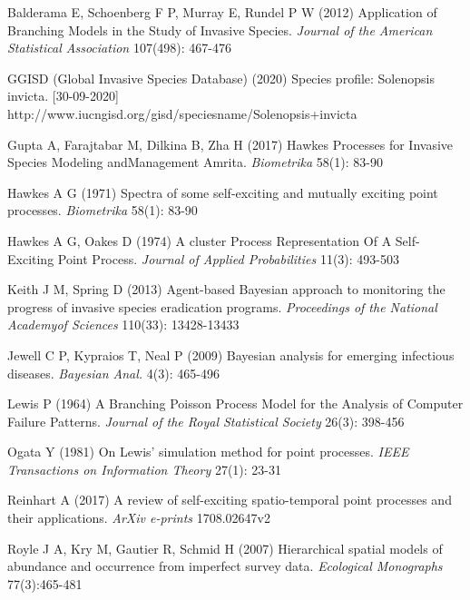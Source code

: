 \documentclass[11pt,a4paper]{article}
\begin{document}
{\begin{algorithm}[H]
\begin{algorithmic}
 \end{algorithmic}
\end{algorithm}

}



\begin{thebibliography}{99}

 Balderama E, Schoenberg F P, Murray E, Rundel P W (2012) Application of Branching Models in the Study of Invasive Species. \textit{Journal of the American Statistical Association} 107(498): 467-476

 GGISD (Global Invasive Species Database) (2020) Species profile: Solenopsis invicta. [30-09-2020] http://www.iucngisd.org/gisd/speciesname/Solenopsis+invicta

 Gupta A, Farajtabar M, Dilkina B, Zha H (2017) Hawkes Processes for Invasive Species Modeling andManagement
Amrita. \textit{Biometrika} 58(1): 83-90

 Hawkes A G (1971) Spectra of some self-exciting and mutually exciting point processes. \textit{Biometrika} 58(1): 83-90

 Hawkes A G, Oakes D (1974) A cluster Process Representation Of A Self-Exciting Point Process. \textit{Journal of Applied Probabilities} 11(3): 493-503

 Keith J M, Spring D (2013) Agent-based Bayesian approach to monitoring the progress of invasive species eradication programs. \textit{Proceedings of the National Academyof Sciences} 110(33): 13428-13433

 Jewell C P, Kypraios T, Neal P (2009) Bayesian analysis for emerging infectious diseases. \textit{Bayesian Anal.} 4(3): 465-496

 Lewis P (1964) A Branching Poisson Process Model for the Analysis of Computer Failure Patterns. \textit{Journal of the Royal Statistical Society} 26(3): 398-456

 Ogata Y (1981) On Lewis' simulation method for point processes. \textit{IEEE Transactions on Information Theory} 27(1): 23-31

 Reinhart A (2017) A review of self-exciting spatio-temporal point processes and their applications. \textit{ArXiv e-prints} 1708.02647v2

 Royle J A, Kry M, Gautier R, Schmid H (2007) Hierarchical spatial models of abundance and occurrence from imperfect survey data. \textit{Ecological Monographs} 77(3):465-481


\end{thebibliography}
\end{document}
